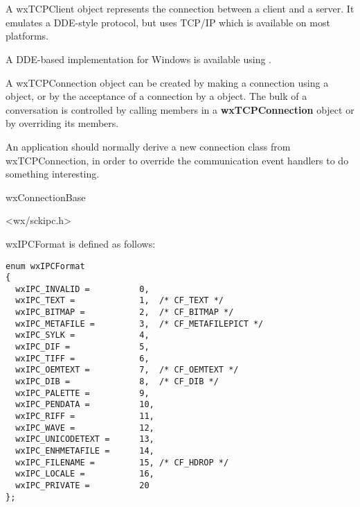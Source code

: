 \section{}\label{wxtcpconnection}

A wxTCPClient object represents the connection between a client and a server.
It emulates a DDE-style protocol, but uses TCP/IP which is available on most platforms.

A DDE-based implementation for Windows is available using .

A wxTCPConnection object can be created by making a connection using a\rtfsp
{} object, or by the acceptance of a connection by a\rtfsp
{} object. The bulk of a conversation is controlled by
calling members in a {\bf wxTCPConnection} object or by overriding its
members.

An application should normally derive a new connection class from
wxTCPConnection, in order to override the communication event handlers
to do something interesting.


wxConnectionBase\\


<wx/sckipc.h>




wxIPCFormat is defined as follows:

\begin{verbatim}
enum wxIPCFormat
{
  wxIPC_INVALID =          0,
  wxIPC_TEXT =             1,  /* CF_TEXT */
  wxIPC_BITMAP =           2,  /* CF_BITMAP */
  wxIPC_METAFILE =         3,  /* CF_METAFILEPICT */
  wxIPC_SYLK =             4,
  wxIPC_DIF =              5,
  wxIPC_TIFF =             6,
  wxIPC_OEMTEXT =          7,  /* CF_OEMTEXT */
  wxIPC_DIB =              8,  /* CF_DIB */
  wxIPC_PALETTE =          9,
  wxIPC_PENDATA =          10,
  wxIPC_RIFF =             11,
  wxIPC_WAVE =             12,
  wxIPC_UNICODETEXT =      13,
  wxIPC_ENHMETAFILE =      14,
  wxIPC_FILENAME =         15, /* CF_HDROP */
  wxIPC_LOCALE =           16,
  wxIPC_PRIVATE =          20
};
\end{verbatim}


